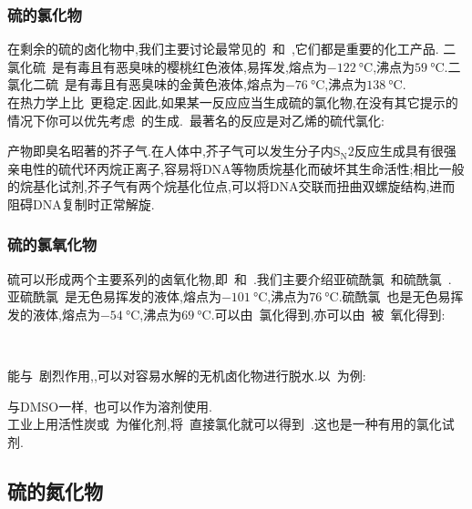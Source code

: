\documentclass{ctexbook}
\begin{document}
\subsubsection{硫的氯化物}
在剩余的硫的卤化物中,我们主要讨论最常见的~和~,它们都是重要的化工产品.
二氯化硫~是有毒且有恶臭味的樱桃红色液体,易挥发,熔点为$\SI{-122}{\celsius}$,沸点为$\SI{59}{\celsius}$.二氯化二硫~是有毒且有恶臭味的金黄色液体,熔点为$\SI{-76}{\celsius}$,沸点为$\SI{138}{\celsius}$.\\
在热力学上比~更稳定.因此,如果某一反应应当生成硫的氯化物,在没有其它提示的情况下你可以优先考虑~的生成.~最著名的反应是对乙烯的硫代氯化:
\begin{tightcenter}
\end{tightcenter}
产物即臭名昭著的芥子气.在人体中,芥子气可以发生分子内$\text{S}_{\text{N}}2$反应生成具有很强亲电性的硫代环丙烷正离子,容易将DNA等物质烷基化而破坏其生命活性;相比一般的烷基化试剂,芥子气有两个烷基化位点,可以将DNA交联而扭曲双螺旋结构,进而阻碍DNA复制时正常解旋\cite{Dacre1996}.
\subsubsection{硫的氯氧化物}
硫可以形成两个主要系列的卤氧化物,即~和~.我们主要介绍亚硫酰氯~和硫酰氯~.
亚硫酰氯~是无色易挥发的液体,熔点为$\SI{-101}{\celsius}$,沸点为$\SI{76}{\celsius}$.硫酰氯~也是无色易挥发的液体,熔点为$\SI{-54}{\celsius}$,沸点为$\SI{69}{\celsius}$.\indent {}可以由~氯化得到,亦可以由~被~氧化得到:
\begin{tightcenter}
    \\
\end{tightcenter}
能与~剧烈作用,,可以对容易水解的无机卤化物进行脱水.以~为例:
\begin{tightcenter}
\end{tightcenter}
与DMSO一样,~也可以作为溶剂使用.\\
\indent 工业上用活性炭或~为催化剂,将~直接氯化就可以得到~.这也是一种有用的氯化试剂.
\subsection{硫的氮化物}
\end{document}
